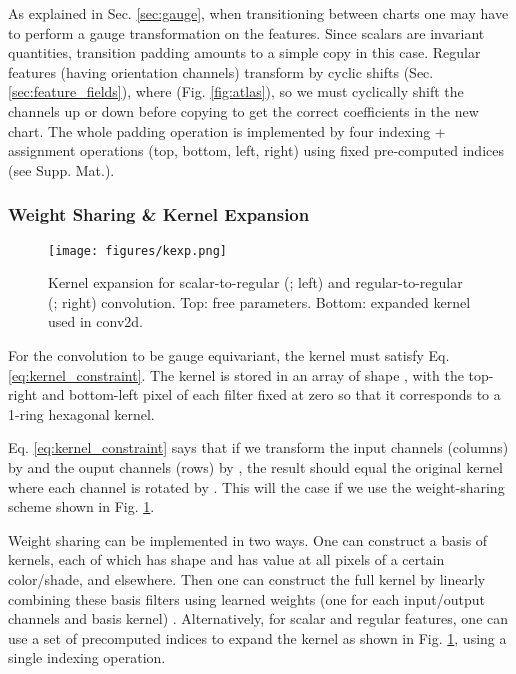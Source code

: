 \documentclass{article}
\begin{document}
As explained in Sec. \ref{sec:gauge}, when transitioning between charts one may have to perform a gauge transformation on the features.
Since scalars are invariant quantities, transition padding amounts to a simple copy in this case.
Regular  features (having  orientation channels) transform by cyclic shifts  (Sec. \ref{sec:feature_fields}), where  (Fig. \ref{fig:atlas}), so we must cyclically shift the channels up or down before copying to get the correct coefficients in the new chart.
The whole padding operation is implemented by four indexing + assignment operations (top, bottom, left, right) using fixed pre-computed indices (see Supp. Mat.).


\subsubsection{Weight Sharing \& Kernel Expansion}
\label{sec:kernel_expansion}

\begin{figure}[h!]
    \centering
    \texttt{[image: figures/kexp.png]}
    \caption{Kernel expansion for scalar-to-regular (; left) and regular-to-regular (; right) convolution. Top: free parameters. Bottom: expanded kernel used in conv2d.}
    \label{fig:kexp}
\end{figure}
For the convolution to be gauge equivariant, the kernel must satisfy Eq. \ref{eq:kernel_constraint}.
The kernel  is stored in an array of shape , with the top-right and bottom-left pixel of each  filter fixed at zero so that it corresponds to a 1-ring hexagonal kernel.

Eq. \ref{eq:kernel_constraint} says that if we transform the input channels (columns) by  and the ouput channels (rows) by , the result should equal the original kernel where each channel is rotated by .
This will the case if we use the weight-sharing scheme shown in Fig. \ref{fig:kexp}.

Weight sharing can be implemented in two ways.
One can construct a basis of kernels, each of which has shape  and has value  at all pixels of a certain color/shade, and  elsewhere.
Then one can construct the full kernel by linearly combining these basis filters using learned weights (one for each  input/output channels and basis kernel) \cite{cohenSteerableCNNs2017, weiler3DSteerableCNNs2018}.
Alternatively, for scalar and regular features, one can use a set of precomputed indices to expand the kernel as shown in Fig. \ref{fig:kexp}, using a single indexing operation.
\end{document}
